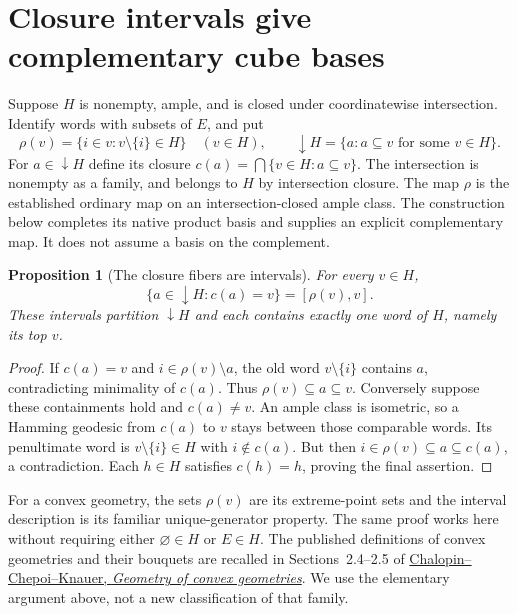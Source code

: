 \documentclass[11pt]{article}
\newtheorem{proposition}[theorem]{Proposition}
\theoremstyle{definition}
\begin{document}
\section{Closure intervals give complementary cube bases}
\label{sec:closure-completion}
Suppose $H$ is nonempty, ample, and is closed under
coordinatewise intersection. Identify words with subsets of $E$, and put
\[
 \rho(v)=\{i\in v:v\setminus\{i\}\in H\}\quad(v\in H),\qquad
 \downarrow H=\{a:a\subseteq v\text{ for some }v\in H\}.
\]
For $a\in\downarrow H$ define its closure
$c(a)=\bigcap\{v\in H:a\subseteq v\}$. The intersection is nonempty
as a family, and belongs to $H$ by intersection closure.
The map $\rho$ is the established ordinary map on an intersection-closed
ample class. The construction below completes its native product basis
and supplies an explicit complementary map. It does not assume a basis
on the complement.

\begin{proposition}[The closure fibers are intervals]\label{prop:closure-intervals}
For every $v\in H$,
\[
 \{a\in\downarrow H:c(a)=v\}=[\rho(v),v].
\]
These intervals partition $\downarrow H$ and each contains exactly one
word of $H$, namely its top $v$.
\end{proposition}
\begin{proof}
If $c(a)=v$ and $i\in\rho(v)\setminus a$, the old word
$v\setminus\{i\}$ contains $a$, contradicting minimality of $c(a)$.
Thus $\rho(v)\subseteq a\subseteq v$.
Conversely suppose these containments hold and $c(a)\ne v$.
An ample class is isometric, so a Hamming geodesic from $c(a)$ to $v$
stays between those comparable words. Its penultimate word is
$v\setminus\{i\}\in H$ with $i\notin c(a)$. But then
$i\in\rho(v)\subseteq a\subseteq c(a)$, a contradiction.
Each $h\in H$ satisfies $c(h)=h$, proving the final assertion.
\end{proof}

For a convex geometry, the sets $\rho(v)$ are its extreme-point sets
and the interval description is its familiar unique-generator property.
The same proof works here without requiring either $\varnothing\in H$
or $E\in H$.
The published definitions of convex geometries and their bouquets are
recalled in Sections~2.4--2.5 of
\href{https://arxiv.org/abs/2405.12660}{Chalopin--Chepoi--Knauer,
\emph{Geometry of convex geometries}}. We use the elementary argument
above, not a new classification of that family.
\end{document}
